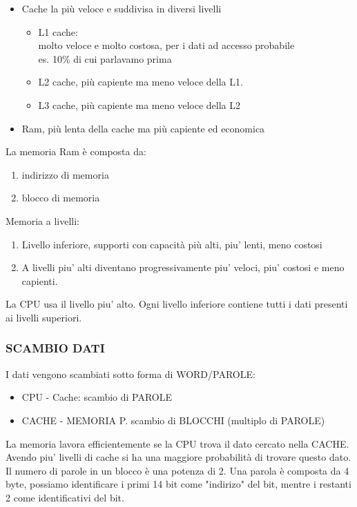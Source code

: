 \documentclass[12pt, a4paper]{article}
\begin{document}
\begin{itemize}
	\item Cache la più veloce e suddivisa in diversi livelli
		\begin{itemize}
			\item L1 cache:\\
				molto veloce e molto costosa, per i dati ad accesso probabile\\
				es. 10\% di cui parlavamo prima
			\item L2 cache, più capiente ma meno veloce della L1.
			\item L3 cache, più capiente ma meno veloce della L2
		\end{itemize}
	\item Ram, più lenta della cache ma più capiente ed economica
\end{itemize}
La memoria Ram è composta da:
\begin{enumerate}
	\item indirizzo di memoria
	\item blocco di memoria 
\end{enumerate}
Memoria a livelli:
\begin{enumerate}
	\item Livello inferiore, supporti con capacità più alti, piu' lenti, meno costosi
	\item A livelli piu' alti diventano progressivamente piu' veloci, piu' costosi
		e meno capienti.
\end{enumerate}
La CPU usa il livello piu' alto. Ogni livello inferiore contiene tutti i dati presenti ai 
livelli superiori.\\

\subsubsection{SCAMBIO DATI}
I dati vengono scambiati sotto forma di WORD/PAROLE:

\begin{itemize}
	\item CPU - Cache: scambio di PAROLE
	\item CACHE - MEMORIA P. scambio di BLOCCHI (multiplo di PAROLE)
\end{itemize}
La memoria lavora efficientemente se la CPU trova il dato cercato nella CACHE. Avendo 
piu' livelli di cache si ha una maggiore probabilità di trovare questo dato.\\

Il numero di parole in un blocco è una potenza di 2. \newline
Una parola è composta da 4 byte, possiamo identificare i primi 14 bit come "indirizo" del bit, mentre i restanti 2 come identificativi del bit.
\end{document}
